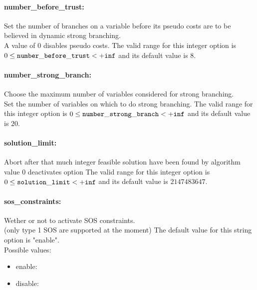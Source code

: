\paragraph{number\_before\_trust:}\label{sec:number_before_trust} Set the number of branches on a variable before its pseudo costs are to be believed in dynamic strong branching. $\;$ \\
 A value of 0 disables pseudo costs. The valid range for this integer option is
$0 \le {\tt number\_before\_trust } <  {\tt +inf}$
and its default value is $8$.


\paragraph{number\_strong\_branch:}\label{sec:number_strong_branch} Choose the maximum number of variables considered for strong branching. $\;$ \\
 Set the number of variables on which to do strong
branching. The valid range for this integer option is
$0 \le {\tt number\_strong\_branch } <  {\tt +inf}$
and its default value is $20$.


\paragraph{solution\_limit:}\label{sec:solution_limit} Abort after that much integer feasible solution have been found by algorithm $\;$ \\
 value 0 deactivates option The valid range for this integer option is
$0 \le {\tt solution\_limit } <  {\tt +inf}$
and its default value is $2147483647$.


\paragraph{sos\_constraints:}\label{sec:sos_constraints} Wether or not to activate SOS constraints. $\;$ \\
 (only type 1 SOS are supported at the moment)
The default value for this string option is "enable".
\\ 
Possible values:
\begin{itemize}
   \item enable: 
   \item disable: 
\end{itemize}

